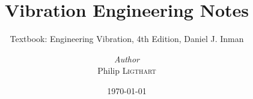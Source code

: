 \documentclass[a4paper, 12pt]{report}
\title{Vibration Engineering Notes}
\subtitle{Textbook: Engineering Vibration, 4th Edition, Daniel J. Inman}
\author{\textit{Author}\\Philip \textsc{Ligthart}}
\date{\today}
\begin{document}
    \maketitle
    \romantableofcontents

    
    
    
\end{document}
